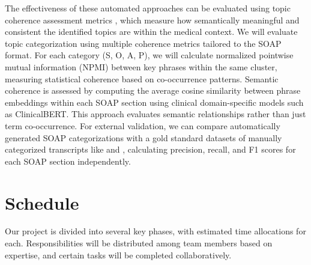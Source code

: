 \documentclass[11pt,a4paper]{article}
\begin{document}
The effectiveness of these automated approaches can be evaluated using topic coherence assessment metrics \cite{stammbach2023revisitingautomatedtopicmodel} , which measure how semantically meaningful and consistent the identified topics are within the medical context. We will evaluate topic categorization using multiple coherence metrics tailored to the SOAP format. For each category (S, O, A, P), we will calculate normalized pointwise mutual information (NPMI) between key phrases within the same cluster, measuring statistical coherence based on co-occurrence patterns. Semantic coherence is assessed by computing the average cosine similarity between phrase embeddings within each SOAP section using clinical domain-specific models such as ClinicalBERT. This approach evaluates semantic relationships rather than just term co-occurrence. For external validation, we can compare automatically generated SOAP categorizations with a gold standard datasets of manually categorized transcripts like \cite{zeng-etal-2020-meddialog} and \cite{finley-etal-2018-automated}, calculating precision, recall, and F1 scores for each SOAP section independently.


\section{Schedule}
Our project is divided into several key phases, with estimated time allocations for each. Responsibilities will be distributed among team members based on expertise, and certain tasks will be completed collaboratively.
\end{document}
